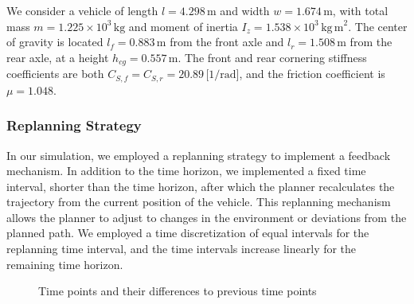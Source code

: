 We consider a vehicle of length \(l = 4.298\,\mathrm{m}\) and width \(w = 1.674\,\mathrm{m}\), with total mass \(m = 1.225\times10^3\,\mathrm{kg}\)
and moment of inertia \(I_z = 1.538\times10^3\,\mathrm{kg\,m}^2\).
The center of gravity is located \(l_f = 0.883\,\mathrm{m}\) from the front axle and \(l_r = 1.508\,\mathrm{m}\) from the rear axle, at a height
\(h_{cg} = 0.557\,\mathrm{m}\).
The front and rear cornering stiffness coefficients are both \(C_{S,f} = C_{S,r} = 20.89\,\text{[1/rad]}\), and the friction coefficient is \(\mu =
1.048\).

\subsubsection{Replanning Strategy}

In our simulation, we employed a replanning strategy to implement a feedback mechanism.
In addition to the time horizon, we implemented a fixed time interval, shorter than the time horizon, after which the planner recalculates the
trajectory from the current position of the vehicle.
This replanning mechanism allows the planner to adjust to changes in the environment or deviations from the planned path.
We employed a time discretization of equal intervals for the replanning time interval, and the time intervals increase linearly for the remaining
time horizon.

\begin{figure}[h]
	\centering
	\caption{Time points and their differences to previous time points}
	\label{fig:time_points}
\end{figure}

